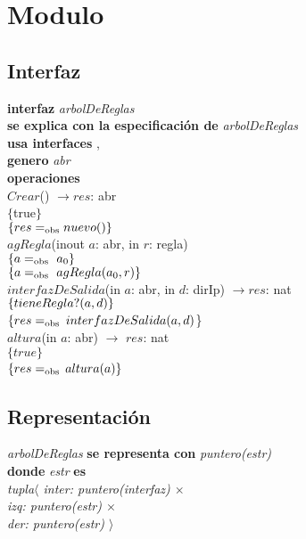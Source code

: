 \section*{Modulo }

\subsection*{Interfaz}
\textbf{interfaz} \textit{arbolDeReglas}\\
\textbf{se explica con la especificaci\'on de} \textit{arbolDeReglas}\\
\textbf{usa interfaces} , \\
\textbf{genero} \textit{abr}\\

\textbf{operaciones}\\
$Crear$() $\longrightarrow res$: abr\\
$\{$true$\}$\\
$\{{res} =_{\mathrm{obs}} nuevo()\}$\\

$agRegla$(inout $a$: abr, in $r$: regla)\\
$\{\sombreritoWide{a} \igobs\ a_0\}$\\
$\{\sombreritoWide{a} \igobs\ agRegla(a_0,\sombreritoWide{r})\}$\\

$interfazDeSalida$(in $a$: abr, in $d$: dirIp) $\longrightarrow res$: nat\\
$\{tieneRegla?({a},{d})\}$\\
$\{{res}=_{\mathrm{obs}}$ $interfazDeSalida({a},{d})$\}\\

$altura$(in $a$: abr) $\longrightarrow$	$res$: nat\\
$\{true\}$\\
$\{{res}=_{\mathrm{obs}}$ $altura({a})\}$\\


\subsection*{Representaci\'on}
\textit{arbolDeReglas} \textbf{se representa con} \textit{puntero(estr)}\\
\textbf{donde} \textit{estr} \textbf{es}\\
\textit{tupla$\langle$ inter: puntero(interfaz) $\times$\\
\hspace*{1.1cm}izq: puntero(estr) $\times$\\
\hspace*{1.1cm}der: puntero(estr) $\rangle$}

